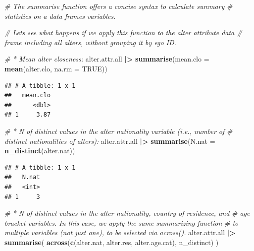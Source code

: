 \documentclass[
]{book}
\newenvironment{Shaded}{\begin{snugshade}}{\end{snugshade}}
\newcommand{\AttributeTok}[1]{\textcolor[rgb]{0.13,0.29,0.53}{#1}}
\newcommand{\CommentTok}[1]{\textcolor[rgb]{0.56,0.35,0.01}{\textit{#1}}}
\newcommand{\ConstantTok}[1]{\textcolor[rgb]{0.56,0.35,0.01}{#1}}
\newcommand{\FunctionTok}[1]{\textcolor[rgb]{0.13,0.29,0.53}{\textbf{#1}}}
\newcommand{\NormalTok}[1]{#1}
\newcommand{\SpecialCharTok}[1]{\textcolor[rgb]{0.81,0.36,0.00}{\textbf{#1}}}
\begin{document}
\begin{Shaded}
\begin{Highlighting}[]
\CommentTok{\# The summarise function offers a concise syntax to calculate summary }
\CommentTok{\# statistics on a data frame\textquotesingle{}s variables. }

\CommentTok{\# Let\textquotesingle{}s see what happens if we apply this function to the alter attribute data}
\CommentTok{\# frame including all alters, without grouping it by ego ID.}

\CommentTok{\# * Mean alter closeness:}
\NormalTok{alter.attr.all }\SpecialCharTok{|\textgreater{}}
  \FunctionTok{summarise}\NormalTok{(}\AttributeTok{mean.clo =} \FunctionTok{mean}\NormalTok{(alter.clo, }\AttributeTok{na.rm =} \ConstantTok{TRUE}\NormalTok{))}
\end{Highlighting}
\end{Shaded}

\begin{verbatim}
## # A tibble: 1 x 1
##   mean.clo
##      <dbl>
## 1     3.87
\end{verbatim}

\begin{Shaded}
\begin{Highlighting}[]
\CommentTok{\# * N of distinct values in the alter nationality variable (i.e., number of }
\CommentTok{\# distinct nationalities of alters):}
\NormalTok{alter.attr.all }\SpecialCharTok{|\textgreater{}}
  \FunctionTok{summarise}\NormalTok{(}\AttributeTok{N.nat =} \FunctionTok{n\_distinct}\NormalTok{(alter.nat))}
\end{Highlighting}
\end{Shaded}

\begin{verbatim}
## # A tibble: 1 x 1
##   N.nat
##   <int>
## 1     3
\end{verbatim}

\begin{Shaded}
\begin{Highlighting}[]
\CommentTok{\# * N of distinct values in the alter nationality, country of residence, and}
\CommentTok{\# age bracket variables. In this case, we apply the same summarizing function}
\CommentTok{\# to multiple variables (not just one), to be selected via across().}
\NormalTok{alter.attr.all }\SpecialCharTok{|\textgreater{}}
  \FunctionTok{summarise}\NormalTok{(}
    \FunctionTok{across}\NormalTok{(}\FunctionTok{c}\NormalTok{(alter.nat, alter.res, alter.age.cat), }
\NormalTok{           n\_distinct)}
\NormalTok{    )}
\end{Highlighting}
\end{Shaded}
\end{document}
